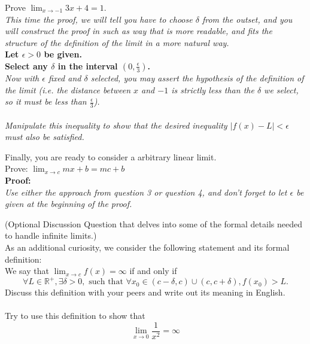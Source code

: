 \documentclass{ximera}
\begin{document}
\begin{exercise}
    Prove $\lim_{x\rightarrow-1}3x+4=1$.\\
    \textit{This time the proof, we will tell you have to choose $\delta$ from the outset, and you will construct the proof in such as way that is more readable, and fits the structure of the definition of the limit in a more natural way.}\\
    \textbf{Let $\epsilon>0$ be given.}\\
    \textbf{Select any $\delta$ in the interval $(0,\frac{\epsilon}{3})$.}\\
    \textit{Now with $\epsilon$ fixed and $\delta$ selected, you may assert the hypothesis of the definition of the limit (i.e. the distance between $x$ and $-1$ is strictly less than the $\delta$ we select, so it must be less than $\frac{\epsilon}{3}$).}\\
    \\
    \textit{Manipulate this inequality to show that the desired inequality $|f(x)-L|<\epsilon$ must also be satisfied.}
\end{exercise}

\begin{exercise}
    Finally, you are ready to consider a arbitrary linear limit.\\
    Prove: $\lim_{x\rightarrow c}mx+b=mc+b$\\
    \textbf{Proof:}\\
    \textit{Use either the approach from question 3 or question 4, and don't forget to let $\epsilon$ be given at the beginning of the proof.}
\end{exercise}

\begin{exercise}
    (Optional Discussion Question that delves into some of the formal details needed to handle infinite limits.)\\
    As an additional curiosity, we consider the following statement and its formal definition:\\
    We say that $\lim_{x\rightarrow c}f(x)=\infty$ if and only if
    \[\forall L\in \mathbb{R}^+, \exists \delta>0, \text{ such that }\forall x_0\in(c-\delta,c)\cup(c,c+\delta), f(x_0)>L.\]
    Discuss this definition with your peers and write out its meaning in English.\\
    \\
    Try to use this definition to show that 
    \[\lim_{x\rightarrow 0}\frac{1}{x^2}=\infty\]
\end{exercise}
\end{document}
